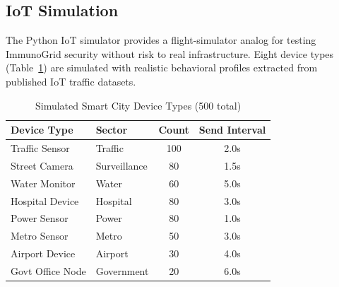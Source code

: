 \subsection{IoT Simulation}

The Python IoT simulator provides a flight-simulator analog for testing
ImmunoGrid security without risk to real infrastructure. Eight device types
(Table~\ref{tab:device_types}) are simulated with realistic behavioral profiles
extracted from published IoT traffic datasets.

\begin{table}[h]
\caption{Simulated Smart City Device Types (500 total)}
\label{tab:device_types}
\centering
\begin{tabular}{llcc}
\toprule
\textbf{Device Type} & \textbf{Sector} & \textbf{Count} & \textbf{Send Interval} \\
\midrule
Traffic Sensor    & Traffic      & 100 & 2.0s \\
Street Camera     & Surveillance & 80  & 1.5s \\
Water Monitor     & Water        & 60  & 5.0s \\
Hospital Device   & Hospital     & 80  & 3.0s \\
Power Sensor      & Power        & 80  & 1.0s \\
Metro Sensor      & Metro        & 50  & 3.0s \\
Airport Device    & Airport      & 30  & 4.0s \\
Govt Office Node  & Government   & 20  & 6.0s \\
\bottomrule
\end{tabular}
\end{table}
